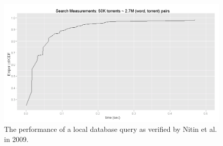 \begin{figure}[h!]
	\centering
	\includegraphics[width=1.0\columnwidth]{images/experiments/nitin_local_search}
	\caption{The performance of a local database query as verified by Nitin et al. in 2009.}
	\label{fig:local-search-nitin}
\end{figure}

